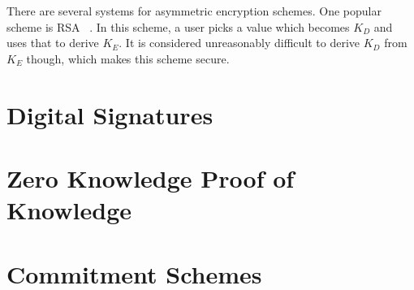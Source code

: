 There are several systems for asymmetric encryption schemes. One popular scheme is RSA ~\cite{RSA}. In this scheme, a user picks a value which becomes
$K_D$ and uses that to derive $K_E$. It is considered unreasonably difficult to derive $K_D$ from $K_E$ though, which makes this scheme secure.



\section{Digital Signatures}

\section{Zero Knowledge Proof of Knowledge}

\section{Commitment Schemes}
